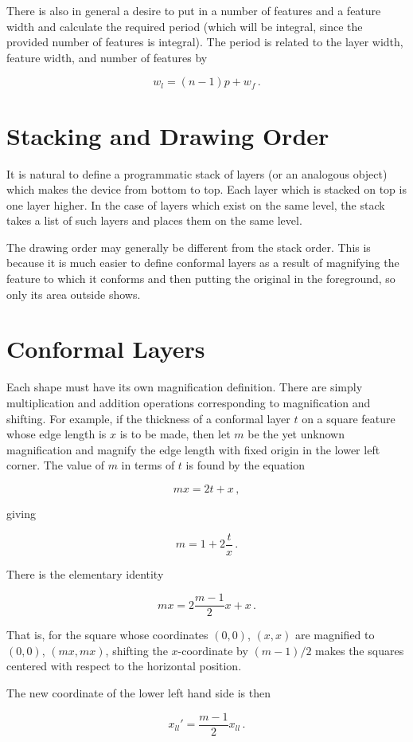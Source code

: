 \documentclass{article}
\begin{document}
There is also in general a desire to put in a number of features and a feature width and calculate the required period (which will be integral, since the provided number of features is integral). The period is related to the layer width, feature width, and number of features by

$$ w_l = (n-1)p + w_f\,. $$


\section{Stacking and Drawing Order}
It is natural to define a programmatic stack of layers (or an analogous object) which makes the device from bottom to top. Each layer which is stacked on top is one layer higher. In the case of layers which exist on the same level, the stack takes a list of such layers and places them on the same level.

The drawing order may generally be different from the stack order. This is because it is much easier to define conformal layers as a result of magnifying the feature to which it conforms and then putting the original in the foreground, so only its area outside shows.

\section{Conformal Layers}
Each shape must have its own magnification definition. There are simply multiplication and addition operations corresponding to magnification and shifting. For example, if the thickness of a conformal layer $t$ on a square feature whose edge length is $x$ is to be made, then let $m$ be the yet unknown magnification and magnify the edge length with fixed origin in the lower left corner. The value of $m$ in terms of $t$ is found by the equation

$$ m x = 2t + x\,, $$

giving

$$ m = 1 + 2 \frac tx \,.$$

There is the elementary identity

$$mx = 2 \frac{m-1}{2} x + x \,. $$

That is, for the square whose coordinates $(0,0)$, $(x,x)$ are magnified to $(0,0)$, $(mx,mx)$, shifting the $x$-coordinate by $(m-1)/2$ makes the squares centered with respect to the horizontal position.

The new coordinate of the lower left hand side is then 

$$x_{ll}' = \frac{m-1}{2} x_{ll} \,. $$
\end{document}
